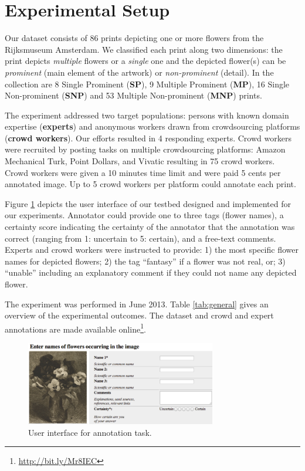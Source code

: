 \documentclass{sig-alternate-2013}
\begin{document}
\section{Experimental Setup}
Our dataset consists of 86 prints depicting one or more flowers from the Rijksmuseum Amsterdam. We classified each print along two dimensions: the print depicts \textit{multiple} flowers or a \textit{single} one and the depicted flower(s) can be \textit{prominent} (main element of the artwork) or \textit{non-prominent} (detail). In the collection are 8 Single Prominent (\textbf{SP}), 9 Multiple Prominent (\textbf{MP}), 16 Single Non-prominent (\textbf{SNP}) and 53 Multiple Non-prominent (\textbf{MNP}) prints.

The experiment addressed two target populations: persons with known domain expertise (\textbf{experts}) and anonymous workers drawn from crowdsourcing platforms (\textbf{crowd workers}). Our efforts resulted in 4 responding experts. Crowd workers were recruited by posting tasks on multiple crowdsourcing platforms: Amazon Mechanical Turk, Point Dollars, and Vivatic resulting in 75 crowd workers. Crowd workers were given a 10 minutes time limit and were paid 5 cents per annotated image. Up to 5 crowd workers per platform could annotate each print.

Figure \ref{fig:ui} depicts the user interface of our testbed designed and implemented for our experiments. Annotator could provide one to three tags (flower names), a certainty score indicating the certainty of the annotator that the annotation was correct (ranging from 1: uncertain to 5: certain), and a free-text comments. Experts and crowd workers were instructed to provide: 1) the most specific flower names for depicted flowers; 2) the tag ``fantasy'' if a flower was not real, or; 3) ``unable'' including an explanatory comment if they could not name any depicted flower.

The experiment was performed in June 2013. Table \ref{tab:general} gives an overview of the experimental outcomes. The dataset and crowd and expert annotations are made available online\footnote{\url{http://bit.ly/Mr8IEC}}.

\begin{figure}[t]
\includegraphics[height=3.65cm]{ui}
\caption{User interface for annotation task.}
\label{fig:ui}
\end{figure}
\end{document}
